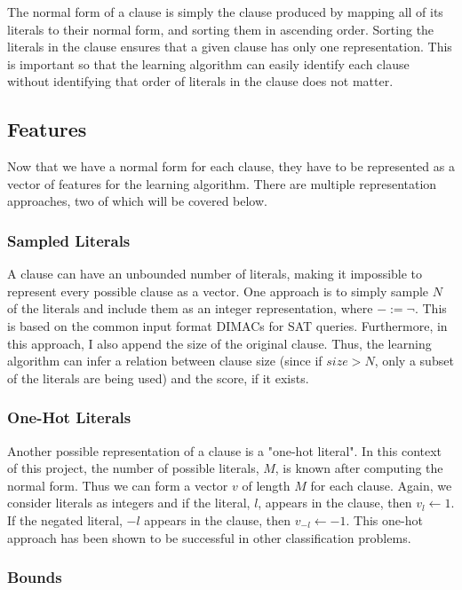 \documentclass[letterpaper]{article} %
\begin{document}
The normal form of a clause is simply the clause produced by mapping all of its literals to their normal form, and sorting them in ascending order. Sorting the literals in the clause ensures that a given clause has only one representation. This is important so that the learning algorithm can easily identify each clause without identifying that order of literals in the clause does not matter.

\subsection{Features}

Now that we have a normal form for each clause, they have to be represented as a vector of features for the learning algorithm. There are multiple representation approaches, two of which will be covered below.

\subsubsection{Sampled Literals}

A clause can have an unbounded number of literals, making it impossible to represent every possible clause as a vector. One approach is to simply sample $N$ of the literals and include them as an integer representation, where $- := \neg$. This is based on the common input format DIMACs for SAT queries. Furthermore, in this approach, I also append the size of the original clause. Thus, the learning algorithm can infer a relation between clause size (since if $size > N$, only a subset of the literals are being used) and the score, if it exists.

\subsubsection{One-Hot Literals}

Another possible representation of a clause is a "one-hot literal". In this context of this project, the number of possible literals, $M$, is known after computing the normal form. Thus we can form a vector $v$ of length $M$ for each clause. Again, we consider literals as integers and if the literal, $l$, appears in the clause, then $v_l \gets 1$. If the negated literal, $-l$ appears in the clause, then $v_{-l} \gets -1$. This one-hot approach has been shown to be successful in other classification problems.

\subsubsection{Bounds}
\end{document}

